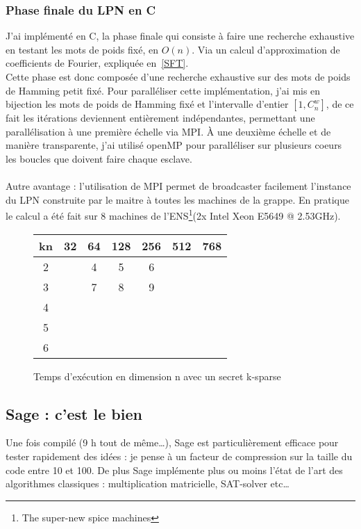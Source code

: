 \documentclass{article}		%
\theoremstyle{definition}
\theoremstyle{plain}
\theoremstyle{plain}
\theoremstyle{plain}
\theoremstyle{plain}
\begin{document}
\subsubsection{Phase finale du LPN en C}
J'ai implémenté en C, la phase finale qui consiste à faire une recherche
exhaustive en testant les mots de poids fixé, en $O(n)$. Via un calcul
d'approximation de coefficients de Fourier, expliquée en~\ref{SFT}.
\\
Cette phase est donc composée d'une recherche exhaustive sur des mots de
poids de Hamming petit fixé. Pour paralléliser cette implémentation, j'ai
mis en bijection les mots de poids de Hamming fixé et l'intervalle
d'entier $[1, C_{n}^{w}]$, de ce fait les itérations deviennent
entièrement indépendantes, permettant une parallélisation à une première
échelle via MPI.
À une deuxième échelle et de manière transparente, j'ai utilisé openMP
pour paralléliser sur plusieurs coeurs les boucles que doivent faire
chaque esclave. 
\\\\
Autre avantage : l'utilisation de MPI permet de broadcaster facilement
l'instance du LPN construite par le maitre à toutes les machines de la
grappe. En pratique le calcul a été fait sur 8 machines de
l'ENS\footnote{The super-new spice machines}(2x Intel Xeon E5649 @
2.53GHz).  
\begin{figure}
\caption{Temps d'exécution en dimension n avec un secret k-sparse}
\begin{center}
\begin{tabular}{|c |c | c | c | c |c|c| }
\hline
   kn & 32 & 64 & 128 & 256 & 512 & 768 \\
\hline
 2  & &4 & 5 & 6 & &\\
\hline
  3 & &7 & 8 & 9 & &\\
\hline
 4 & & & & & & \\
 \hline
5 & & & & & & \\
 \hline
6 & & & & & & \\
\hline 
\end{tabular}
\end{center}
\end{figure}


\subsection{Sage : c'est le bien}
 Une fois compilé (9 h tout de même\dots), Sage est particulièrement efficace
pour tester rapidement des idées : je pense à un facteur de compression
sur la taille du code
entre 10 et 100. De plus Sage
implémente plus ou moins l'état de l'art des algorithmes classiques : multiplication
matricielle, SAT-solver etc\dots  
\end{document}
